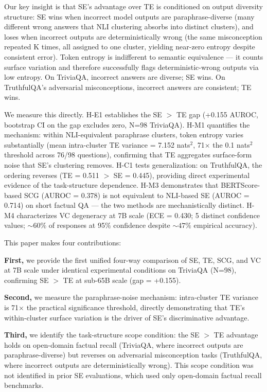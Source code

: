 Our key insight is that SE's advantage over TE is conditioned on output diversity structure: SE wins when incorrect model outputs are paraphrase-diverse (many different wrong answers that NLI clustering absorbs into distinct clusters), and loses when incorrect outputs are deterministically wrong (the same misconception repeated K times, all assigned to one cluster, yielding near-zero entropy despite consistent error).
Token entropy is indifferent to semantic equivalence --- it counts surface variation and therefore successfully flags deterministic-wrong outputs via low entropy.
On TriviaQA, incorrect answers are diverse; SE wins.
On TruthfulQA's adversarial misconceptions, incorrect answers are consistent; TE wins.

We measure this directly.
H-E1 establishes the SE $>$ TE gap (+0.155 AUROC, bootstrap CI on the gap excludes zero, N=98 TriviaQA).
H-M1 quantifies the mechanism: within NLI-equivalent paraphrase clusters, token entropy varies substantially (mean intra-cluster TE variance = 7.152 nats$^2$, 71$\times$ the 0.1 nats$^2$ threshold across 76/98 questions), confirming that TE aggregates surface-form noise that SE's clustering removes.
H-C1 tests generalization: on TruthfulQA, the ordering reverses (TE = 0.511 $>$ SE = 0.445), providing direct experimental evidence of the task-structure dependence.
H-M3 demonstrates that BERTScore-based SCG (AUROC = 0.378) is not equivalent to NLI-based SE (AUROC = 0.714) on short factual QA --- the two methods are mechanistically distinct.
H-M4 characterizes VC degeneracy at 7B scale (ECE = 0.430; 5 distinct confidence values; ${\sim}60\%$ of responses at 95\% confidence despite ${\sim}47\%$ empirical accuracy).

This paper makes four contributions:

\textbf{First,} we provide the first unified four-way comparison of SE, TE, SCG, and VC at 7B scale under identical experimental conditions on TriviaQA (N=98), confirming SE $>$ TE at sub-65B scale (gap = +0.155).

\textbf{Second,} we measure the paraphrase-noise mechanism: intra-cluster TE variance is 71$\times$ the practical significance threshold, directly demonstrating that TE's within-cluster surface variation is the driver of SE's discriminative advantage.

\textbf{Third,} we identify the task-structure scope condition: the SE $>$ TE advantage holds on open-domain factual recall (TriviaQA, where incorrect outputs are paraphrase-diverse) but reverses on adversarial misconception tasks (TruthfulQA, where incorrect outputs are deterministically wrong).
This scope condition was not identified in prior SE evaluations, which used only open-domain factual recall benchmarks.

